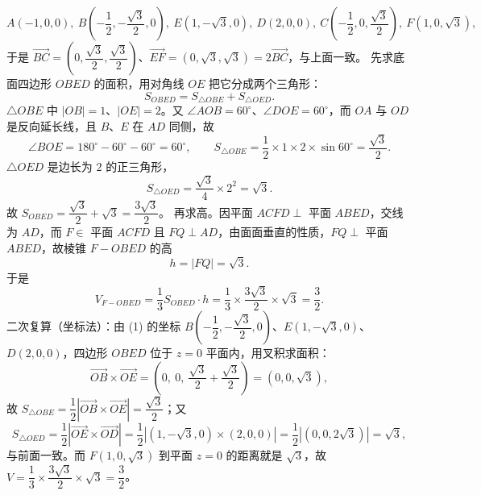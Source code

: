 \begin{answer}
\nopagebreak[4]
\[
A(-1,0,0),\ B\left(-\frac12,-\frac{\sqrt3}{2},0\right),\ E\left(1,-\sqrt3,0\right),\ D(2,0,0),\ C\left(-\frac12,0,\frac{\sqrt3}{2}\right),\ F\left(1,0,\sqrt3\right),
\]
于是 $\overrightarrow{BC}=\left(0,\dfrac{\sqrt3}{2},\dfrac{\sqrt3}{2}\right)$、$\overrightarrow{EF}=\left(0,\sqrt3,\sqrt3\right)=2\overrightarrow{BC}$，与上面一致。
先求底面四边形 $OBED$ 的面积，用对角线 $OE$ 把它分成两个三角形：
\nopagebreak[4]
\[
S_{OBED}=S_{\triangle OBE}+S_{\triangle OED}.
\]
$\triangle OBE$ 中 $|OB|=1$、$|OE|=2$。又 $\angle AOB=60^\circ$、$\angle DOE=60^\circ$，而 $OA$ 与 $OD$ 是反向延长线，且 $B$、$E$ 在 $AD$ 同侧，故
\nopagebreak[4]
\[
\angle BOE=180^\circ-60^\circ-60^\circ=60^\circ,\qquad
S_{\triangle OBE}=\frac12\times1\times2\times\sin60^\circ=\frac{\sqrt3}{2}.
\]
$\triangle OED$ 是边长为 $2$ 的正三角形，
\nopagebreak[4]
\[
S_{\triangle OED}=\frac{\sqrt3}{4}\times2^2=\sqrt3.
\]
故 $S_{OBED}=\dfrac{\sqrt3}{2}+\sqrt3=\dfrac{3\sqrt3}{2}$。
再求高。因平面 $ACFD\perp$ 平面 $ABED$，交线为 $AD$，而 $F\in$ 平面 $ACFD$ 且 $FQ\perp AD$，由面面垂直的性质，$FQ\perp$ 平面 $ABED$，故棱锥 $F-OBED$ 的高
\nopagebreak[4]
\[
h=|FQ|=\sqrt3.
\]
于是
\nopagebreak[4]
\[
V_{F-OBED}=\frac13 S_{OBED}\cdot h=\frac13\times\frac{3\sqrt3}{2}\times\sqrt3=\frac32.
\]
二次复算（坐标法）：由 (1) 的坐标 $B\left(-\dfrac12,-\dfrac{\sqrt3}{2},0\right)$、$E\left(1,-\sqrt3,0\right)$、$D(2,0,0)$，四边形 $OBED$ 位于 $z=0$ 平面内，用叉积求面积：
\nopagebreak[4]
\[
\overrightarrow{OB}\times\overrightarrow{OE}=\left(0,\ 0,\ \frac{\sqrt3}{2}+\frac{\sqrt3}{2}\right)=(0,0,\sqrt3),
\]
故 $S_{\triangle OBE}=\dfrac12\left|\overrightarrow{OB}\times\overrightarrow{OE}\right|=\dfrac{\sqrt3}{2}$；又
\nopagebreak[4]
\[
S_{\triangle OED}=\frac12\left|\overrightarrow{OE}\times\overrightarrow{OD}\right|
=\frac12\left|(1,-\sqrt3,0)\times(2,0,0)\right|
=\frac12\left|(0,0,2\sqrt3)\right|=\sqrt3,
\]
与前面一致。而 $F(1,0,\sqrt3)$ 到平面 $z=0$ 的距离就是 $\sqrt3$，故 $V=\dfrac13\times\dfrac{3\sqrt3}{2}\times\sqrt3=\dfrac32$。



\end{answer}
